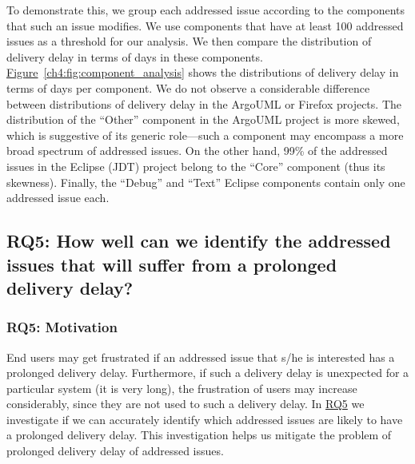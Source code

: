 \noindent{} To demonstrate this, we group
each addressed issue according to the components that such an issue modifies. We use
components that have at least 100 addressed issues as a threshold for our analysis.
We then compare the distribution of delivery delay in terms of days in these
components.
\hyperref[ch4:fig:component_analysis]{Figure}~\ref{ch4:fig:component_analysis} shows the
distributions of delivery delay in terms of days per component. We do not
observe a considerable difference between distributions of delivery delay in
the ArgoUML or Firefox projects. The distribution of the ``Other'' component in
the ArgoUML project is more skewed, which is suggestive of its generic
role---such a component may encompass a more broad spectrum of addressed issues. On
the other hand, 99\% of the addressed issues in the Eclipse (JDT) project belong to
the ``Core'' component (thus its skewness). Finally, the ``Debug'' and ``Text''
Eclipse components contain only one addressed issue each.   


\subsection{RQ5: How well can we identify the addressed issues
that will suffer from a prolonged delivery delay?}\label{ch4:rq5}

\subsubsection*{RQ5: Motivation} 

End users may get frustrated if an addressed issue that s/he is interested has a
prolonged delivery delay. Furthermore, if such a delivery delay is unexpected for a
particular system (\eg it is very long), the frustration of users may increase
considerably, since they are not used to such a delivery delay. In
\hyperref[ch4:rq5]{RQ5} we
investigate if we can accurately identify which addressed issues are likely to
have a prolonged delivery delay. This investigation helps us mitigate the problem of
prolonged delivery delay of addressed issues.

